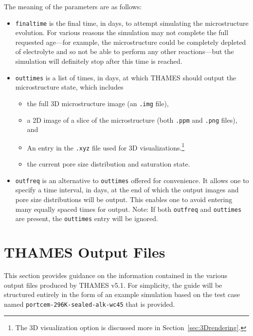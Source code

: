 \documentclass{article}
\begin{document}
{\normalsize{ }
The meaning of the parameters are as follows:
\begin{itemize}
	\item \verb!finaltime! is the final time, in days, to attempt simulating
	      the microstructure evolution. For various reasons the simulation may not
	      complete the full requested age---for example, the microstructure could
	      be completely depleted of electrolyte and so not be able to perform any
	      other reactions---but the simulation will definitely stop
	      after this time is reached.
	\item \verb!outtimes! is a list of times, in days, at which THAMES should
	      output the microstructure state, which includes
	      \begin{itemize}
		      \item the full 3D microstructure image (an \verb!.img! file),
		      \item a 2D image of a slice of the microstructure (both \verb!.ppm!
		            and \verb!.png! files), and
		      \item An entry in the \verb!.xyz! file used for 3D
		            visualizations.\footnote{The 3D visualization option is
			            discussed more in Section~\ref{sec:3Drendering}.}
		      \item the current pore size distribution and saturation state.
	      \end{itemize}
	\item \verb!outfreq! is an alternative to \verb!outtimes! offered for
	      convenience. It allows one to specify a time interval, in days, at the end
	      of which the output images and pore size distributions will be output.
	      This enables one to avoid entering many equally spaced times for output.
	      Note: If both \verb!outfreq! and \verb!outtimes! are present, the
	      \verb!outtimes! entry will be ignored.
\end{itemize}

\section{\label{sec:outputguide} THAMES Output Files}
This section provides guidance on the information contained in the various output files
produced by THAMES v5.1. For simplicity, the guide will be structured entirely
in the form of an example simulation based on the test case named
\verb!portcem-296K-sealed-alk-wc45! that is provided.

}
\end{document}
